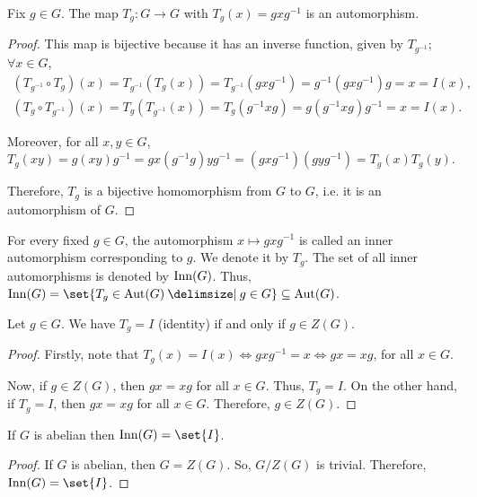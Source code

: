 \documentclass[11pt]{penrose}
\begin{document}
\begin{nprop}
    Fix $g \in G$. The map $T_{g} : G \to G$ with $T_{g}(x) = g x g^{-1}$ is an automorphism.
\end{nprop}
\begin{proof}
    This map is bijective because it has an inverse function, given by $T_{g^{-1}}$; $\forall x \in G$,
    \begin{gather*}
        (T_{g^{-1}} \circ T_{g}) (x) = T_{g^{-1}}( T_{g}(x) ) = T_{g^{-1}}( g x g^{-1} ) = g^{-1} ( g x g^{-1} ) g = x = I(x),\\
        (T_{g} \circ T_{g^{-1}}) (x) = T_{g}( T_{g^{-1}}(x) ) = T_{g}( g^{-1} x g ) = g ( g^{-1} x g ) g^{-1} = x = I(x).
    \end{gather*}

    Moreover, for all $x, y \in G$, $T_{g} (xy) = g (xy) g^{-1} = g x (g^{-1}g) y g^{-1} = (g x g^{-1})(g y g^{-1}) = T_{g}(x) T_{g}(y)$.

    Therefore, $T_{g}$ is a bijective homomorphism from $G$ to $G$, i.e. it is an automorphism of $G$.
\end{proof}

\begin{ndfn}
    For every fixed $g \in G$, the automorphism $x \mapsto g x g^{-1}$ is called an inner automorphism corresponding to $g$. We denote it by $T_{g}$. The set of all inner automorphisms is denoted by $\operatorname{Inn}(G)$. Thus, $\Inn(G) = \set{T_{g} \in \Aut(G) \st g \in G} \subseteq \Aut(G)$.
\end{ndfn}

\begin{nprop}
    Let $g \in G$. We have $T_{g} = I$ (identity) if and only if $g \in Z(G)$.
\end{nprop}
\begin{proof}
    Firstly, note that $T_{g}(x) = I(x) \iff g x g^{-1} = x \iff g x = x g$, for all $x \in G$.

    Now, if $g \in Z(G)$, then $gx = xg$ for all $x \in G$. Thus, $T_{g} = I$. On the other hand, if $T_{g} = I$, then $gx = xg$ for all $x \in G$. Therefore, $g \in Z(G)$.
\end{proof}

\begin{ncor}
    If $G$ is abelian then $\Inn(G) = \set{I}$.
\end{ncor}
\begin{proof}
    If $G$ is abelian, then $G = Z(G)$. So, $G/Z(G)$ is trivial. Therefore, $\Inn(G) = \set{I}$.
\end{proof}
\end{document}
